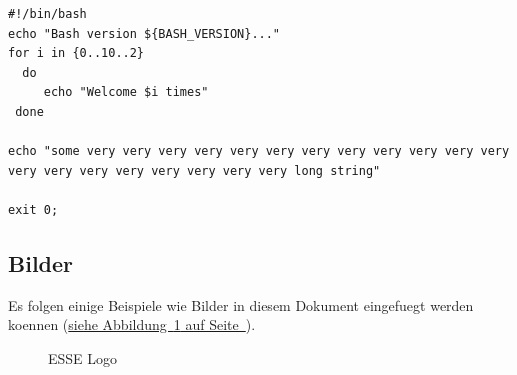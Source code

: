 \documentclass[12pt,a4paper,titlepage,oneside]{scrartcl}
\begin{document}


\begin{lstlisting}[caption=Example bash script,label=code:beispiel2,style=simple]
#!/bin/bash
echo "Bash version ${BASH_VERSION}..."
for i in {0..10..2}
  do
     echo "Welcome $i times"
 done

echo "some very very very very very very very very very very very very very very very very very very very very long string"

exit 0;
\end{lstlisting}

\subsection{Bilder}

Es folgen einige Beispiele wie Bilder in diesem Dokument eingefuegt werden koennen
(\hyperref[fig:logo1]{siehe Abbildung~\ref*{fig:logo1} auf Seite~\pageref*{fig:logo1}}).

\begin{figure}[h!]
  \centering
  \caption{ESSE Logo}
  \label{fig:logo1}
\end{figure}


%
%
\end{document}
